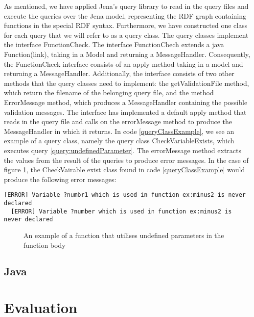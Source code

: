 \para
As mentioned, we have applied Jena's query library to read in the query files and execute the queries over the Jena model, representing the RDF graph containing functions in the special RDF syntax. Furthermore, we have constructed one class for each query that we will refer to as a query class. The query classes implement the interface FunctionCheck. The interface FunctionChech extends a java Function(link), taking in a Model and returning a MessageHandler. Consequently, the FunctionCheck interface consists of an apply method taking in a model and returning a MessageHandler. Additionally, the interface consists of two other methods that the query classes need to implement: the getValidationFile method, which return the filename of the belonging query file, and the method ErrorMessage method, which produces a MessageHandler containing the possible validation messages. The interface has implemented a default apply method that reads in the query file and calls on the errorMessage method to produce the MessageHandler in which it returns. In code \ref{queryClassExample}, we see an example of a query class, namely the query class CheckVariableExists, which executes query \ref{query:undefinedParameter}. The errorMessage method extracts the values from the result of the queries to produce error messages. In the case of figure \ref{fig:validation_erro_example}, the CheckVairable exist class found in  code \ref{queryClassExample} would produce the following error messages:  

\begin{lstlisting}[language=lutraMessages]
  [ERROR] Variable ?numbr1 which is used in function ex:minus2 is never declared 
  [ERROR] Variable ?number which is used in function ex:minus2 is never declared 
\end{lstlisting}

\begin{figure}[h]
  
  \caption{An example of a function that utilises undefined parameters in the function body}
  \label{fig:validation_erro_example}
\end{figure}

 

\subsection{Java}

\section{Evaluation}
\label{implementation_evaluation}

